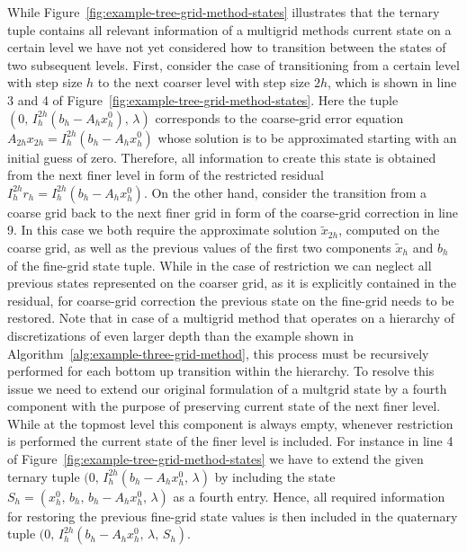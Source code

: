 While Figure~\ref{fig:example-tree-grid-method-states} illustrates that the ternary tuple contains all relevant information of a multigrid methods current state on a certain level we have not yet considered how to transition between the states of two subsequent levels.
First, consider the case of transitioning from a certain level with step size $h$ to the next coarser level with step size $2h$, which is shown in line 3 and 4 of Figure~\ref{fig:example-tree-grid-method-states}.
Here the tuple $(0, \, I_{h}^{2h}(b_{h} - A_h x_{h}^0), \, \lambda)$ corresponds to the coarse-grid error equation $A_{2h} x_{2h} = I_{h}^{2h}(b_{h} - A_h x_{h}^0)$ whose solution is to be approximated starting with an initial guess of zero.
Therefore, all information to create this state is obtained from the next finer level in form of the restricted residual $I_h^{2h} r_h = I_h^{2h} (b_{h} - A_h x_{h}^0)$.
On the other hand, consider the transition from a coarse grid back to the next finer grid in form of the coarse-grid correction in line 9.
In this case we both require the approximate solution $\tilde{x}_{2h}$, computed on the coarse grid, as well as the previous values of the first two components $\tilde{x}_h$ and $b_h$ of the fine-grid state tuple.
While in the case of restriction we can neglect all previous states represented on the coarser grid, as it is explicitly contained in the residual, for coarse-grid correction the previous state on the fine-grid needs to be restored.
Note that in case of a multigrid method that operates on a hierarchy of discretizations of even larger depth than the example shown in Algorithm~\ref{alg:example-three-grid-method}, this process must be recursively performed for each bottom up transition within the hierarchy.
To resolve this issue we need to extend our original formulation of a multgrid state by a fourth component with the purpose of preserving current state of the next finer level.
While at the topmost level this component is always empty, whenever restriction is performed the current state of the finer level is included.
For instance in line 4 of Figure~\ref{fig:example-tree-grid-method-states} we have to extend the given ternary tuple $(0, \, I_{h}^{2h}(b_{h} - A_h x_{h}^0, \, \lambda)$ by including the state $S_h = (x_{h}^0, \, b_h, \, b_{h} - A_h x_{h}^0, \, \lambda)$ as a fourth entry. 
Hence, all required information for restoring the previous fine-grid state values is then included in the quaternary tuple $(0, \, I_{h}^{2h}(b_{h} - A_h x_{h}^0, \, \lambda, \, S_h)$.
